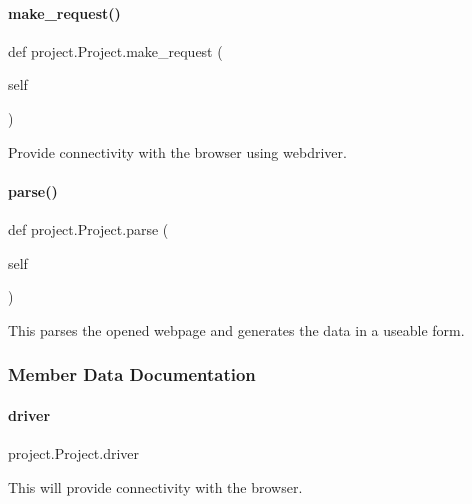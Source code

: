 \paragraph{\texorpdfstring{make\+\_\+request()}{make\_request()}}
{\footnotesize\ttfamily def project.\+Project.\+make\+\_\+request (\begin{DoxyParamCaption}\item[{}]{self }\end{DoxyParamCaption})}

\begin{DoxyVerb}Provide connectivity with the browser using webdriver.\end{DoxyVerb}
 \mbox{\label{classproject_1_1Project_a8b0632dc91022b3127cbd76da7e5420c}} 
\paragraph{\texorpdfstring{parse()}{parse()}}
{\footnotesize\ttfamily def project.\+Project.\+parse (\begin{DoxyParamCaption}\item[{}]{self }\end{DoxyParamCaption})}

\begin{DoxyVerb}This parses the opened webpage and generates the data in a useable form.\end{DoxyVerb}
 

\subsubsection{Member Data Documentation}
\mbox{\label{classproject_1_1Project_a1445a6c709827f6c88b5cf755341fb28}} 
\paragraph{\texorpdfstring{driver}{driver}}
{\footnotesize\ttfamily project.\+Project.\+driver}



This will provide connectivity with the browser. 

\mbox{\label{classproject_1_1Project_a18aa35e3a410570e67d7241c2a59e3ea}} 
